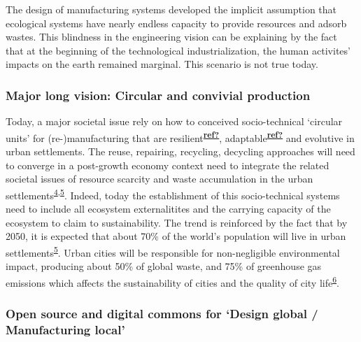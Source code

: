 \documentclass[
  11pt,
  a4paperpaper,
  onecolumn]{article}
\begin{document}
The design of manufacturing systems developed the implicit assumption
that ecological systems have nearly endless capacity to provide
resources and adsorb wastes. This blindness in the engineering vision
can be explaining by the fact that at the beginning of the technological
industrialization, the human activites' impacts on the earth remained
marginal. This scenario is not true today.

\hypertarget{major-long-vision-circular-and-convivial-production}{%
\subsubsection{Major long vision: Circular and convivial
production}\label{major-long-vision-circular-and-convivial-production}}

Today, a major societal issue rely on how to conceived socio-technical
`circular units' for (re-)manufacturing that are
resilient\textsuperscript{\protect\hyperlink{ref-ref}{\textbf{ref?}}},
adaptable\textsuperscript{\protect\hyperlink{ref-ref}{\textbf{ref?}}}
and evolutive in urban settlements. The reuse, repairing, recycling,
decycling approaches will need to converge in a post-growth economy
context need to integrate the related societal issues of resource
scarcity and waste accumulation in the urban
settlements\textsuperscript{\protect\hyperlink{ref-kallis2018}{4},\protect\hyperlink{ref-savini2021}{5}}.
Indeed, today the establishment of this socio-technical systems need to
include all ecosystem externalitites and the carrying capacity of the
ecosystem to claim to sustainability. The trend is reinforced by the
fact that by 2050, it is expected that about 70\% of the world's
population will live in urban
settlements\textsuperscript{\protect\hyperlink{ref-savini2021}{5}}.
Urban cities will be responsible for non-negligible environmental
impact, producing about 50\% of global waste, and 75\% of greenhouse gas
emissions which affects the sustainability of cities and the quality of
city life\textsuperscript{\protect\hyperlink{ref-Riffat2016}{6}}.

\hypertarget{open-source-and-digital-commons-for-design-global-manufacturing-local}{%
\subsubsection{Open source and digital commons for `Design global /
Manufacturing
local'}\label{open-source-and-digital-commons-for-design-global-manufacturing-local}}
\end{document}
